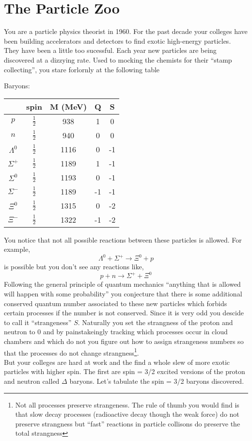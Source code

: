 \documentclass[12pt]{article}
\begin{document}
\section{The Particle Zoo}

You are a particle physics theorist in 1960. For the past decade your colleges have been building accelerators and detectors to find exotic high-energy particles. They have been a little too sucessful. Each year new particles are being discovered at a dizzying rate. Used to mocking the chemists for their 	``stamp collecting'', you stare forlornly at the following table 

Baryons:


\renewcommand{\arraystretch}{1.30}

\begin{center}
\begin{tabular}{||c | c c c c ||} 
 \hline
 & spin & M (MeV) & Q & S \\ [0.5ex] 
 \hline\hline
$p$ & $\tfrac{1}{2}$ & 938 & 1 & 0 \\ 
 \hline
$n$ & $\tfrac{1}{2}$ & 940 & 0 & 0 \\ 
 \hline
$\Lambda^0$ & $\tfrac{1}{2}$ & 1116 & 0 & -1 \\ 
 \hline
$\Sigma^+$ & $\tfrac{1}{2}$ & 1189 & 1 & -1 \\ 
 \hline
$\Sigma^0$ & $\tfrac{1}{2}$ & 1193 & 0 & -1 \\ 
 \hline
$\Sigma^{-}$ & $\tfrac{1}{2}$ & 1189 & -1 & -1 \\ 
 \hline
$\Xi^0$ & $\tfrac{1}{2}$ & 1315 & 0 & -2 \\ 
 \hline
$\Xi^{-}$ & $\tfrac{1}{2}$ & 1322 & -1 & -2 \\ 
 \hline
\end{tabular}
\end{center}

You notice that not all possible reactions between these particles is allowed. For example,
\[ \Lambda^0 + \Sigma^+ \to \Xi^0 + p \]
is possible but you don't see any reactions like,
\[ p + n \to \Sigma^+ + \Xi^0 \]
Following the general principle of quantum mechanics ``anything that is allowed will happen with some probability'' you conjecture that there is some additional conserved quantum number associated to these new particles which forbids certain processes if the number is not conserved. Since it is very odd you descide to call it ``strangeness'' $S$. Naturally you set the strangness of the proton and neutron to $0$ and by painstakeingly tracking which processes occur in cloud chambers and which do not you figure out how to assign strangeness numbers so that the processes do not change strangness\footnote{Not all processes preserve strangeness. The rule of thumb you would find is that slow decay processes (radioactive decay though the weak force) do not preserve strangness but ``fast'' reactions in particle collisons do preserve the total strangness}.
\\
But your colleges are hard at work and the find a whole slew of more exotic particles with higher spin. The first are spin = 3/2 excited versions of the proton and neutron called $\Delta$ baryons. Let's tabulate the spin = 3/2 baryons discovered.
\end{document}
